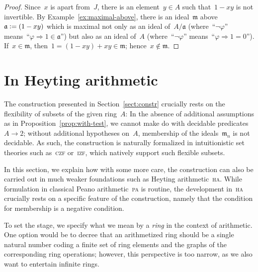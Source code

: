 \documentclass[envcountsect,envcountsame,runningheads]{llncs}
\newcommand{\aaa}{\mathfrak{a}}
\newcommand{\mmm}{\mathfrak{m}}
\newcommand{\defeq}{\vcentcolon=}
\renewcommand{\_}{\mathpunct{.}\,}
\begin{document}
\begin{proof}Since~$x$ is apart from~$J$, there is an element~$y \in A$ such that~$1-xy$
is not invertible. By Example~\ref{ex:maximal-above}, there is an ideal~$\mmm$
above~$\aaa \defeq (1-xy)$ which is maximal not only as an ideal of~$A/\aaa$
(where~``$\neg\varphi$'' means~``$\varphi \Rightarrow 1 \in \aaa$'') but also as an
ideal of~$A$ (where~``$\neg\varphi$'' means~``$\varphi \Rightarrow 1 = 0$''). If~$x
\in \mmm$, then~$1 = (1-xy) + xy \in \mmm$; hence~$x \not\in \mmm$.
\end{proof}


\section{In Heyting arithmetic}
\label{sect:arithmetization}

The construction presented in Section~\ref{sect:constr} crucially rests on the
flexibility of subsets of the given ring~$A$: In the absence of additional
assumptions as in Proposition~\ref{prop:with-test},
we cannot make do with decidable
predicates~$A \to 2$; without additional hypotheses on~$A$, membership of the
ideals~$\mmm_n$ is not decidable. As such, the construction is
naturally formalized in intuitionistic set theories such as~\textsc{czf}
or~\textsc{izf}, which natively support such flexible subsets.

In this section, we explain how with some more care, the construction can also
be carried out in much weaker foundations such as Heyting
arithmetic~\textsc{ha}. While formulation in classical Peano arithmetic~\textsc{pa}
is routine, the development in~\textsc{ha} crucially rests on a specific
feature of the construction, namely that the condition for membership is a
negative condition.

To set the stage, we specify what we mean by a \emph{ring} in the context of
arithmetic. One option would be to decree that an arithmetized ring should be a single
natural number coding a finite set of ring elements and the graphs of the
corresponding ring operations; however, this perspective is too narrow, as we
also want to entertain infinite rings.
\end{document}
